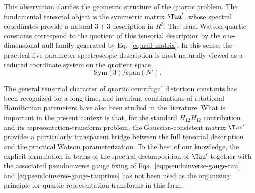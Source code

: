 This observation clarifies the geometric structure of the quartic problem.  The
fundamental tensorial object is the symmetric matrix $\Tau'$, whose spectral
coordinates provide a natural $3+3$ description in $R^3$.  The usual Watson
quartic constants correspond to the quotient of this tensorial description by
the one-dimensional null family generated by Eq.~\eqref{eq:null-matrix}.  In
this sense, the practical five-parameter spectroscopic description is most
naturally viewed as a reduced coordinate system on the quotient space
\begin{equation}
\mathrm{Sym}(3)\big/\mathrm{span}(N').
\end{equation}

The general tensorial character of quartic centrifugal distortion constants has
been recognized for a long time, and invariant combinations of rotational
Hamiltonian parameters have also been studied in the literature.\cite{Yamada1973,Kirschner1983}
What is important in the present context is that, for the standard
$H_{12}H_{12}$ contribution and its representation-transform problem, the
Gaussian-consistent matrix $\Tau'$ provides a particularly transparent bridge
between the full tensorial description and the practical Watson
parameterization.  To the best of our knowledge, the explicit formulation in
terms of the spectral decomposition of $\Tau'$ together with the associated
pseudoinverse gauge fixing of Eqs.~\eqref{eq:pseudoinverse-gauge-tau} and
\eqref{eq:pseudoinverse-gauge-tauprime} has not been used as the organizing
principle for quartic representation transforms in this form.
